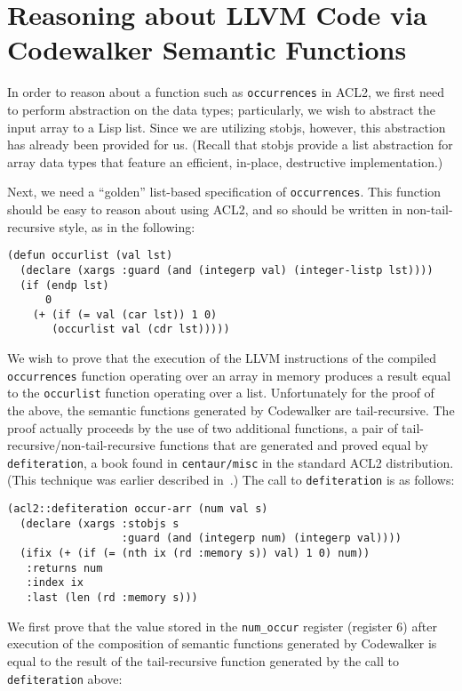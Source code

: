 \documentclass{eptcs}
\begin{document}
\section{Reasoning about LLVM Code via Codewalker Semantic Functions}\label{reasoning}

In order to reason about a function such as \texttt{occurrences} in
ACL2, we first need to perform abstraction on the data types;
particularly, we wish to abstract the input array to a Lisp list.
Since we are utilizing stobjs, however, this abstraction has already
been provided for us.  (Recall that stobjs provide a list abstraction
for array data types that feature an efficient, in-place, destructive implementation.)

Next, we need a ``golden'' list-based specification of
\texttt{occurrences}.  This function should be easy to reason
about using ACL2, and so should be written in non-tail-recursive style,
as in the following:

\begin{verbatim}
(defun occurlist (val lst)
  (declare (xargs :guard (and (integerp val) (integer-listp lst))))
  (if (endp lst)
      0
    (+ (if (= val (car lst)) 1 0)
       (occurlist val (cdr lst)))))
\end{verbatim}

We wish to prove that the execution of the LLVM instructions 
of the compiled \texttt{occurrences} function
operating over an array in memory produces a result equal to the
\texttt{occurlist} function operating over a list.  Unfortunately for
the proof of the above, the semantic functions
generated by Codewalker are tail-recursive.  The proof actually
proceeds by the use of two additional functions, a pair of 
tail-recursive/non-tail-recursive functions that are generated and 
proved equal by \texttt{defiteration}, a book found in 
\texttt{centaur/misc} in the standard ACL2 distribution.  
(This technique was earlier described in~\cite{ACL2GPU}.)  
The call to \texttt{defiteration} is as follows:

\begin{verbatim}
(acl2::defiteration occur-arr (num val s)
  (declare (xargs :stobjs s
                  :guard (and (integerp num) (integerp val))))
  (ifix (+ (if (= (nth ix (rd :memory s)) val) 1 0) num))
   :returns num
   :index ix
   :last (len (rd :memory s)))
\end{verbatim}

We first prove that the value stored in the \texttt{num\_occur}
register (register 6) after execution of the composition of 
semantic functions generated by Codewalker is equal to the 
result of the tail-recursive function generated by the call 
to \texttt{defiteration} above:
\end{document}
